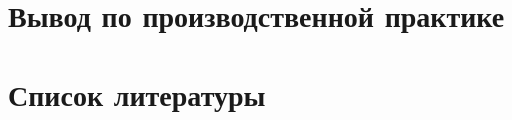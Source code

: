\documentclass{article}
\begin{document}
	\section{Вывод по производственной практике}
	\newpage
	\section{Список литературы}
\end{document}
